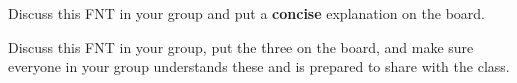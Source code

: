 \WCD

\begin{fnt}
	
\end{fnt}

Discuss this FNT in your group and put a \textbf{concise} explanation on the board.

\WCD

\begin{fnt}
	
\end{fnt}

Discuss this FNT in your group, put the three \forcediags{} on the board, and make sure everyone in your group understands these and is prepared to share with the class.

\WCD